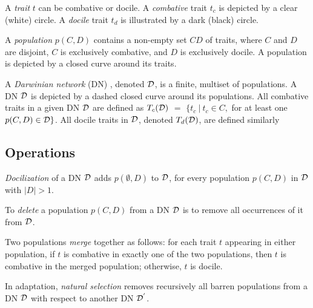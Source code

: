 
		A \emph{trait} $t$ can be combative or docile.
		A \emph{combative} trait $t_c$ is depicted by a clear (white) circle.
		A \emph{docile} trait $t_d$ is illustrated by a dark (black) circle.


		A \emph{population}  $p(C,D)$ contains a non-empty set $CD$ of traits, where $C$ and $D$ are disjoint, $C$ is exclusively combative, and $D$ is exclusively docile.
		A population is depicted by a closed curve around its traits.


		A \emph{Darwinian network} (DN) , denoted $\cal{D}$, is a finite, multiset of populations.
		A DN $\cal{D}$ is depicted by a dashed closed curve around its populations.
		All combative traits in a given DN $\cal{D}$ are defined as $T_c(\cal{D})$ $=$ $\{t_{c} ~ | ~ t_{c} \in C,$ for at least one $p(C,D) \in \cal{D}\}$.
		All docile traits in $\cal{D}$, denoted $T_d(\cal{D})$, are defined similarly


\subsection{Operations}
\label{subsec:operations}



		
		\emph{Docilization} of a DN $\cal{D}$ adds $p(\emptyset,D)$ to $\cal D$, for every population $p(C,D)$ in ${\cal D}$ with $|D| > 1$.
		

		
		To \emph{delete} a population $p(C,D)$ from a DN $\cal{D}$ is to remove all occurrences of it from $\cal{D}$.
		

		
		Two populations \emph{merge} together as follows: for each trait $t$ appearing in either population, if $t$ is combative in exactly one of the two populations, then $t$ is combative in the merged population; otherwise, $t$ is docile.
		

		
		In adaptation, \emph{natural selection} removes recursively all barren populations from a DN $\cal{D}$ with respect to another DN ${\cal{D}}^{'}$.
		

